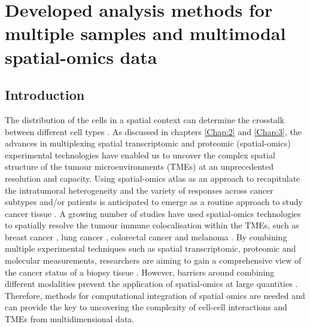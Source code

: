 \chapter[Developed analysis methods for multiple samples and multimodal spatial-omics data]{Developed analysis methods for multiple samples and multimodal spatial-omics data}

\label{Chap:4}	%
\pagestyle{headings}
\label{Sec:4.1_intro}	%
\section{Introduction}
The distribution of the cells in a spatial context can determine the crosstalk between different cell types \cite{van2018spatially}. As discussed in chapters \ref{Chap:2} and \ref{Chap:3}, the advances in multiplexing spatial transcriptomic and proteomic (spatial-omics) experimental technologies have enabled us to uncover the complex spatial structure of the tumour microenvironments (TMEs) at an unprecedented resolution and capacity. Using spatial-omics atlas as an approach to recapitulate the intratumoral heterogeneity and the variety of responses across cancer subtypes and/or patients is anticipated to emerge as a routine approach to study cancer tissue \cite{wu2022spatial,napoli2022functional,marsh2022approaches}. A growing number of studies have used spatial-omics technologies to spatially resolve the tumour immune colocalisation within the TMEs, such as breast cancer \cite{jackson2020single, ali2020imaging}, lung cancer \cite{sorin2023single}, colorectal cancer \cite{schurch2020coordinated, pelka2021spatially} and melanoma \cite{nirmal2022spatial}. By combining multiple experimental techniques such as spatial transcriptomic, proteomic and molecular measurements, researchers are aiming to gain a comprehensive view of the cancer status of a biopsy tissue \cite{boehm2022harnessing}. However, barriers around combining different modalities prevent the application of spatial-omics at large quantities \cite{wu2022spatial, vickovic2022sm}. Therefore, methods for computational integration of spatial omics are needed and can provide the key to uncovering the complexity of cell-cell interactions and TMEs from multidimensional data.  
 
